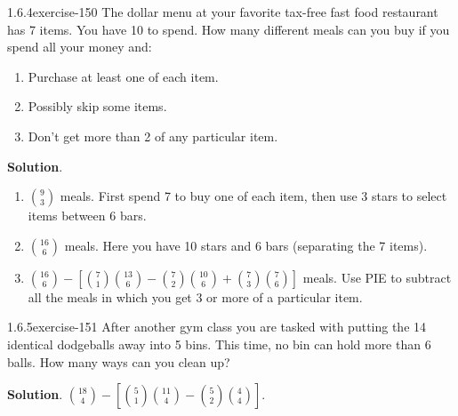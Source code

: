 \documentclass[twoside,11pt,]{book}
\numberwithin{equation}{chapter}
\begin{document}
\begin{divisionsolution}{1.6.4}{}{exercise-150}%
\hypertarget{p-2525}{}%
The dollar menu at your favorite tax-free fast food restaurant has 7 items. You have \textdollar{}10 to spend. How many different meals can you buy if you spend all your money and:\leavevmode%
\begin{enumerate}[label=(\alph*)]
\item\hypertarget{li-1514}{}\hypertarget{p-2526}{}%
Purchase at least one of each item.%
\item\hypertarget{li-1515}{}\hypertarget{p-2528}{}%
Possibly skip some items.%
\item\hypertarget{li-1516}{}\hypertarget{p-2530}{}%
Don't get more than 2 of any particular item.%
\end{enumerate}
%
\par\smallskip%
\noindent\textbf{Solution}.\quad%
\hypertarget{p-2532}{}%
\leavevmode%
\begin{enumerate}[label=(\alph*)]
\item\hypertarget{li-1517}{}\hypertarget{p-2533}{}%
\({9 \choose 3}\) meals. First spend \textdollar{}7 to buy one of each item, then use 3 stars to select items between 6 bars.%
\item\hypertarget{li-1518}{}\hypertarget{p-2534}{}%
\({16 \choose 6}\) meals. Here you have 10 stars and 6 bars (separating the 7 items).%
\item\hypertarget{li-1519}{}\hypertarget{p-2535}{}%
\({16 \choose 6} - \left[{7 \choose 1}{13 \choose 6} - {7 \choose 2}{10 \choose 6} + {7 \choose 3}{7 \choose 6}\right]\) meals. Use PIE to subtract all the meals in which you get 3 or more of a particular item.%
\end{enumerate}
%
\end{divisionsolution}%
\begin{divisionsolution}{1.6.5}{}{exercise-151}%
\hypertarget{p-2539}{}%
After another gym class you are tasked with putting the 14 identical dodgeballs away into 5 bins. This time, no bin can hold more than 6 balls. How many ways can you clean up?%
\par\smallskip%
\noindent\textbf{Solution}.\quad%
\hypertarget{p-2541}{}%
\({18 \choose 4} - \left[ {5 \choose 1}{11 \choose 4} - {5 \choose 2}{4 \choose 4}\right]\text{.}\)%
\end{divisionsolution}%
\end{document}
